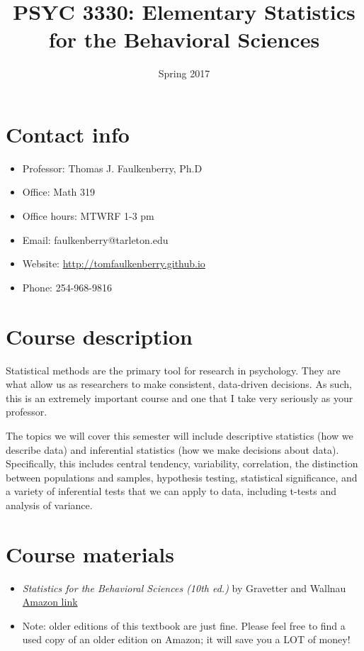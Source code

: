\documentclass[10pt]{article}
\date{Spring 2017}
\title{PSYC 3330: Elementary Statistics for the Behavioral Sciences}
\begin{document}
\maketitle

\section*{Contact info}
\label{sec-1}
\begin{itemize}
\item Professor: Thomas J. Faulkenberry, Ph.D
\item Office: Math 319
\item Office hours: MTWRF 1-3 pm
\item Email: faulkenberry@tarleton.edu
\item Website: \url{http://tomfaulkenberry.github.io}
\item Phone: 254-968-9816
\end{itemize}

\section*{Course description}
\label{sec-2}

Statistical methods are the primary tool for research in psychology.  
They are what allow us as researchers to make consistent, data-driven 
decisions.  As such, this is an extremely important course and one that I 
take very seriously as your professor.

The topics we will cover this semester will include descriptive statistics 
(how we describe data) and inferential statistics (how we make decisions 
about data).  Specifically, this includes central tendency, variability, 
correlation, the distinction between populations and samples, hypothesis 
testing, statistical significance, and a variety of inferential tests 
that we can apply to data, including t-tests and analysis of variance.

\section*{Course materials}
\label{sec-3}
\begin{itemize}
\item \emph{Statistics for the Behavioral Sciences (10th ed.)} by Gravetter and Wallnau \href{http://www.amazon.com/Statistics-Behavioral-Sciences-MindTap-Psychology/dp/1305504917/}{Amazon link}
\item Note:  older editions of this textbook are just fine.  Please feel free to find a used copy of an older edition on Amazon; it will save you a LOT of money!
\end{itemize}
\end{document}
